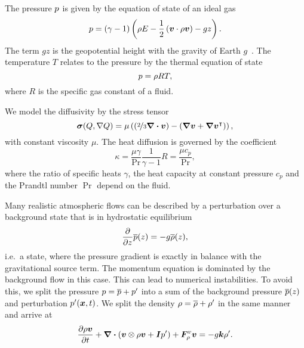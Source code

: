 \documentclass[runningheads]{llncs}
\begin{document}
The pressure $p$ is given by the equation of state of an ideal gas
\begin{equation}
  \label{eq:eos}
  p = (\gamma - 1) \left(\rho E - \frac{1}{2} \left(\bm{v} \cdot \rho \bm{v} \right) - gz \right).
\end{equation}
The term $gz$ is the geopotential height with the gravity of Earth $g$~\cite{giraldo2008study}.
The temperature $T$ relates to the pressure by the thermal equation of state
\begin{equation}
  \label{eq:temperature}
  p = \rho R T,
\end{equation}
where $R$ is the specific gas constant of a fluid.

We model the diffusivity by the stress tensor
\begin{equation}
  \label{eq:stress-tensor}
  \stressT(Q, \nabla Q) =
  \mu
  \left(
  \left(\nicefrac{2}{3} \divergence{\Qv} \right) -
  \left( \gradient{\Qv} + \gradient{\Qv}^\intercal \right)
  \right),
\end{equation}
with constant viscosity $\mu$.
The heat diffusion is governed by the coefficient
\begin{equation}
  \label{eq:heat-conduction-coeff}
  \kappa = \frac{\mu \gamma}{\Pr} \frac{1}{\gamma - 1} R = \frac{\mu c_p}{\Pr},
\end{equation}
where the ratio of specific heats $\gamma$, the heat capacity at constant pressure $c_p$ and the Prandtl number $\Pr$ depend on the fluid.

Many realistic atmospheric flows can be described by a perturbation over a background state that is in hydrostatic equilibrium
\newcommand{\backgroundPressure}{\overline{\pressure}}
\newcommand{\backgroundRho}{\overline{\Qrho}}
\begin{equation}
  \label{eq:hydrostatic-balance}
  \pdv{}{z} \backgroundPressure{\left (z \right )} = -g \backgroundRho(z),
\end{equation}
i.e.\ a state, where the pressure gradient is exactly in balance with the gravitational source term.
The momentum equation is dominated by the background flow in this case.
This can lead to numerical instabilities.
To avoid this, we split the pressure $\pressure = \backgroundPressure + \pressure'$ into a sum of the background pressure $\backgroundPressure(z)$ and perturbation $p'(\bm{x}, t)$.
We split the density $\Qrho = \backgroundRho + \Qrho'$ in the same manner and arrive at
\begin{equation}
  \label{eq:momentum-equation-split}
  \pdv{\Qj}{t}+ \divergence{ \left(
    \Qv \otimes \Qj + \bm{I} \pressure'
    \right)
  } + \viscFlux_\Qj
  =
  -g \bm{k} \Qrho'.
\end{equation}
\end{document}
